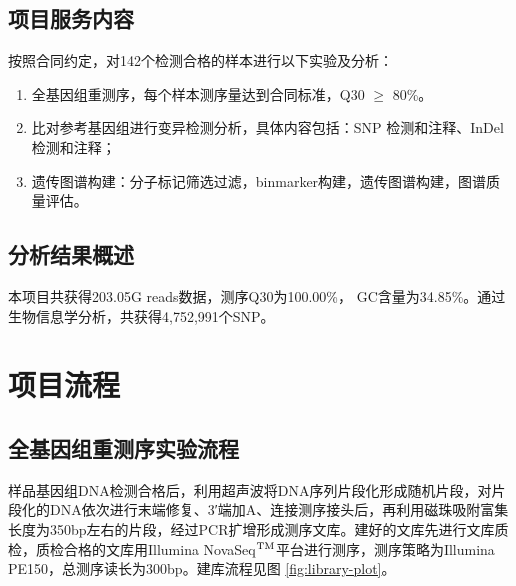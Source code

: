 \documentclass[
  a4paper,
  titlepage]{article}
\begin{document}
\hypertarget{ux9879ux76eeux670dux52a1ux5185ux5bb9}{%
\subsection{项目服务内容}\label{ux9879ux76eeux670dux52a1ux5185ux5bb9}}

按照合同约定，对142个检测合格的样本进行以下实验及分析：

\begin{enumerate}
\def\labelenumi{\arabic{enumi}.}
\item
  全基因组重测序，每个样本测序量达到合同标准，Q30 \(\geq\) 80\%。
\item
  比对参考基因组进行变异检测分析，具体内容包括：SNP 检测和注释、InDel 检测和注释；
\item
  遗传图谱构建：分子标记筛选过滤，binmarker构建，遗传图谱构建，图谱质量评估。
\end{enumerate}

\hypertarget{ux5206ux6790ux7ed3ux679cux6982ux8ff0}{%
\subsection{分析结果概述}\label{ux5206ux6790ux7ed3ux679cux6982ux8ff0}}

本项目共获得203.05G reads数据，测序Q30为100.00\%，
GC含量为34.85\%。通过生物信息学分析，共获得4,752,991个SNP。

\hypertarget{ux9879ux76eeux6d41ux7a0b}{%
\section{项目流程}\label{ux9879ux76eeux6d41ux7a0b}}

\hypertarget{ux5168ux57faux56e0ux7ec4ux91cdux6d4bux5e8fux5b9eux9a8cux6d41ux7a0b}{%
\subsection{全基因组重测序实验流程}\label{ux5168ux57faux56e0ux7ec4ux91cdux6d4bux5e8fux5b9eux9a8cux6d41ux7a0b}}

样品基因组DNA检测合格后，利用超声波将DNA序列片段化形成随机片段，对片段化的DNA依次进行末端修复、3′端加A、连接测序接头后，再利用磁珠吸附富集长度为350bp左右的片段，经过PCR扩增形成测序文库。建好的文库先进行文库质检，质检合格的文库用Illumina NovaSeq\(\rm{^{TM}}\)平台进行测序，测序策略为Illumina PE150，总测序读长为300bp。建库流程见图 \ref{fig:library-plot}。
\end{document}
